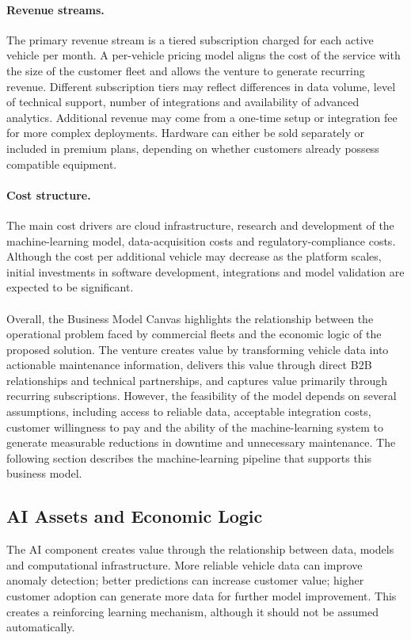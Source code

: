 \documentclass[11pt,a4paper]{article}
\begin{document}
\paragraph{Revenue streams.}
The primary revenue stream is a tiered subscription charged for each active vehicle per month. A per-vehicle pricing model aligns the cost of the service with the size of the customer fleet and allows the venture to generate recurring revenue. Different subscription tiers may reflect differences in data volume, level of technical support, number of integrations and availability of advanced analytics. Additional revenue may come from a one-time setup or integration fee for more complex deployments. Hardware can either be sold separately or included in premium plans, depending on whether customers already possess compatible equipment.

\paragraph{Cost structure.}
The main cost drivers are cloud infrastructure, research and development of the machine-learning model, data-acquisition costs and regulatory-compliance costs. Although the cost per additional vehicle may decrease as the platform scales, initial investments in software development, integrations and model validation are expected to be significant.
\\
\\ Overall, the Business Model Canvas highlights the relationship between the operational problem faced by commercial fleets and the economic logic of the proposed solution. The venture creates value by transforming vehicle data into actionable maintenance information, delivers this value through direct B2B relationships and technical partnerships, and captures value primarily through recurring subscriptions. However, the feasibility of the model depends on several assumptions, including access to reliable data, acceptable integration costs, customer willingness to pay and the ability of the machine-learning system to generate measurable reductions in downtime and unnecessary maintenance. The following section describes the machine-learning pipeline that supports this business model.


\subsection{AI Assets and Economic Logic}

The AI component creates value through the relationship between data, models and computational infrastructure. More reliable vehicle data can improve anomaly detection; better predictions can increase customer value; higher customer adoption can generate more data for further model improvement. This creates a reinforcing learning mechanism, although it should not be assumed automatically.
\end{document}
